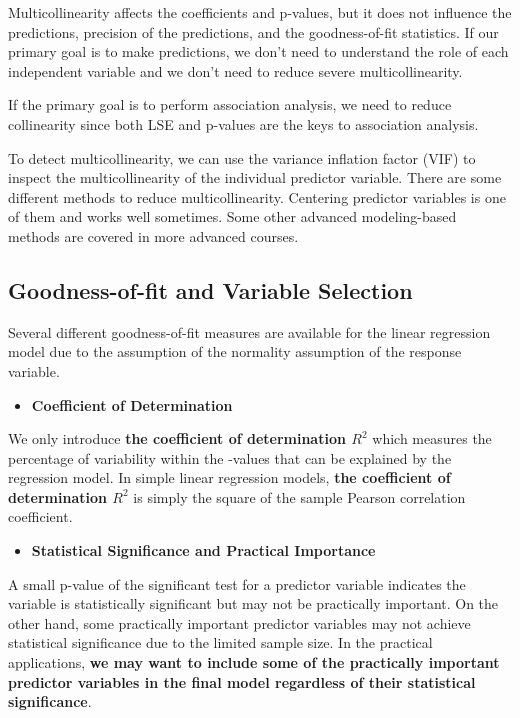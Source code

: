 \documentclass[
]{book}
\providecommand{\tightlist}{%
  \setlength{\itemsep}{0pt}\setlength{\parskip}{0pt}}
\begin{document}
Multicollinearity affects the coefficients and p-values, but it does not influence the predictions, precision of the predictions, and the goodness-of-fit statistics. If our primary goal is to make predictions, we don't need to understand the role of each independent variable and we don't need to reduce severe multicollinearity.

If the primary goal is to perform association analysis, we need to reduce collinearity since both LSE and p-values are the keys to association analysis.

To detect multicollinearity, we can use the variance inflation factor (VIF) to inspect the multicollinearity of the individual predictor variable. There are some different methods to reduce multicollinearity. Centering predictor variables is one of them and works well sometimes. Some other advanced modeling-based methods are covered in more advanced courses.

\hypertarget{goodness-of-fit-and-variable-selection}{%
\subsection{Goodness-of-fit and Variable Selection}\label{goodness-of-fit-and-variable-selection}}

Several different goodness-of-fit measures are available for the linear regression model due to the assumption of the normality assumption of the response variable.

\begin{itemize}
\tightlist
\item
  \textbf{Coefficient of Determination}
\end{itemize}

We only introduce \textbf{the coefficient of determination \(R^2\)} which measures the percentage of variability within the -values that can be explained by the regression model. In simple linear regression models, \textbf{the coefficient of determination \(R^2\)} is simply the square of the sample Pearson correlation coefficient.

\begin{itemize}
\tightlist
\item
  \textbf{Statistical Significance and Practical Importance}
\end{itemize}

A small p-value of the significant test for a predictor variable indicates the variable is statistically significant but may not be practically important. On the other hand, some practically important predictor variables may not achieve statistical significance due to the limited sample size. In the practical applications, \textbf{we may want to include some of the practically important predictor variables in the final model regardless of their statistical significance}.
\end{document}

